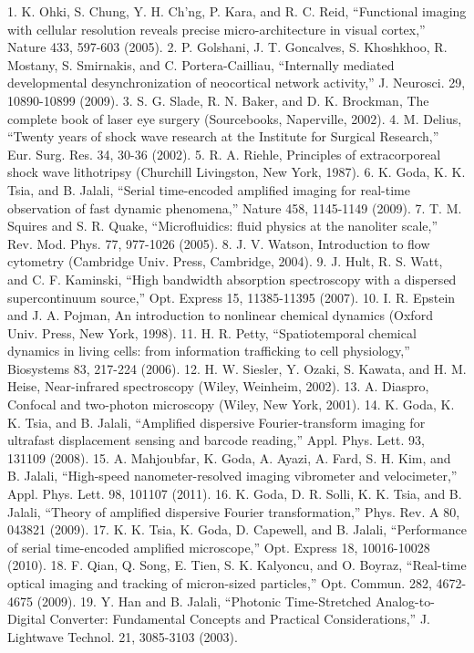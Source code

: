 1.	K. Ohki, S. Chung, Y. H. Ch'ng, P. Kara, and R. C. Reid, “Functional imaging with cellular resolution reveals precise micro-architecture in visual cortex,” Nature 433, 597-603 (2005).
2.	P. Golshani, J. T. Goncalves, S. Khoshkhoo, R. Mostany, S. Smirnakis, and C. Portera-Cailliau, “Internally mediated developmental desynchronization of neocortical network activity,” J. Neurosci. 29, 10890-10899 (2009).
3.	S. G. Slade, R. N. Baker, and D. K. Brockman, The complete book of laser eye surgery (Sourcebooks, Naperville, 2002).
4.	M. Delius, “Twenty years of shock wave research at the Institute for Surgical Research,” Eur. Surg. Res. 34, 30-36 (2002).
5.	R. A. Riehle, Principles of extracorporeal shock wave lithotripsy (Churchill Livingston, New York, 1987).
6.	K. Goda, K. K. Tsia, and B. Jalali, “Serial time-encoded amplified imaging for real-time observation of fast dynamic phenomena,” Nature 458, 1145-1149 (2009).
7.	T. M. Squires and S. R. Quake, “Microfluidics: fluid physics at the nanoliter scale,” Rev. Mod. Phys. 77, 977-1026 (2005).
8.	J. V. Watson, Introduction to flow cytometry (Cambridge Univ. Press, Cambridge, 2004).
9.	J. Hult, R. S. Watt, and C. F. Kaminski, “High bandwidth absorption spectroscopy with a dispersed supercontinuum source,” Opt. Express 15, 11385-11395 (2007).
10.	I. R. Epstein and J. A. Pojman, An introduction to nonlinear chemical dynamics (Oxford Univ. Press, New York, 1998).
11.	H. R. Petty, “Spatiotemporal chemical dynamics in living cells: from information trafficking to cell physiology,” Biosystems 83, 217-224 (2006).
12.	H. W. Siesler, Y. Ozaki, S. Kawata, and H. M. Heise, Near-infrared spectroscopy (Wiley, Weinheim, 2002).
13.	A. Diaspro, Confocal and two-photon microscopy (Wiley, New York, 2001).
14.	K. Goda, K. K. Tsia, and B. Jalali, “Amplified dispersive Fourier-transform imaging for ultrafast displacement sensing and barcode reading,” Appl. Phys. Lett. 93, 131109 (2008).
15.	A. Mahjoubfar, K. Goda, A. Ayazi, A. Fard, S. H. Kim, and B. Jalali, “High-speed nanometer-resolved imaging vibrometer and velocimeter,” Appl. Phys. Lett. 98, 101107 (2011).
16.	K. Goda, D. R. Solli, K. K. Tsia, and B. Jalali, “Theory of amplified dispersive Fourier transformation,” Phys. Rev. A 80, 043821 (2009). 
17.	K. K. Tsia, K. Goda, D. Capewell, and B. Jalali, “Performance of serial time-encoded amplified microscope,” Opt. Express 18, 10016-10028 (2010).
18.	F. Qian, Q. Song, E. Tien, S. K. Kalyoncu, and O. Boyraz, “Real-time optical imaging and tracking of micron-sized particles,” Opt. Commun. 282, 4672-4675 (2009).
19.	Y. Han and B. Jalali, “Photonic Time-Stretched Analog-to-Digital Converter: Fundamental Concepts and Practical Considerations,” J. Lightwave Technol. 21, 3085-3103 (2003).
